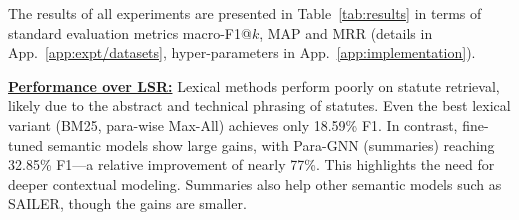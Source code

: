 
\noindent The results of all experiments are presented in Table~\ref{tab:results} in terms of standard evaluation metrics macro-F1@$k$, MAP and MRR (details in App.~\ref{app:expt/datasets}, hyper-parameters in App.~\ref{app:implementation}). 

\vspace{1mm}
\noindent\underline{\textbf{Performance over LSR:}} 
Lexical methods perform poorly on statute retrieval, likely due to the abstract and technical phrasing of statutes. Even the best lexical variant (BM25, para-wise Max-All) achieves only 18.59\% F1. In contrast, fine-tuned semantic models show large gains, with Para-GNN (summaries) reaching 32.85\% F1---a relative improvement of nearly 77\%. This highlights the need for deeper contextual modeling. Summaries also help other semantic models such as SAILER, though the gains are smaller. 

